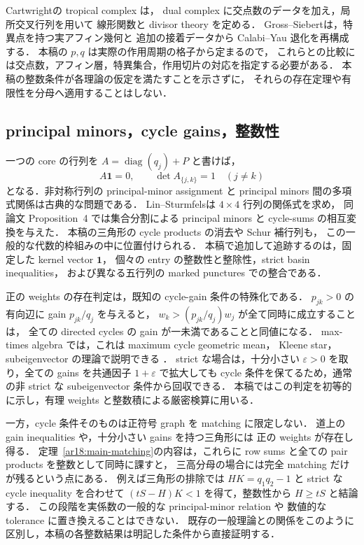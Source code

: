 Cartwright\cite[Definitions~2.5 and~2.8]{CartwrightComplexes}の tropical complex は，
dual complex に交点数のデータを加え，局所交叉行列を用いて
線形関数と divisor theory を定める．
Gross--Siebert\cite{GrossSiebert}は，特異点を持つ実アフィン幾何と
追加の接着データから Calabi--Yau 退化を再構成する．
本稿の $p,q$ は実際の作用周期の格子から定まるので，
これらとの比較には交点数，アフィン層，特異集合，作用切片の対応を指定する必要がある．
本稿の整数条件が各理論の仮定を満たすことを示さずに，
それらの存在定理や有限性を分母へ適用することはしない．

\subsection{principal minors，cycle gains，整数性}

一つの core の行列を $A=\operatorname{diag}(q_j)+P$ と書けば，
\[
 A\mathbf1=0,\qquad \det A_{\{j,k\}}=1\quad(j\ne k)
\]
となる．非対称行列の principal-minor assignment と
principal minors 間の多項式関係は古典的な問題である．
Lin--Sturmfels\cite{LinSturmfels}は $4\times4$ 行列の関係式を求め，
同論文 Proposition~4 では集合分割による principal minors と cycle-sums の相互変換を与えた．
本稿の三角形の cycle products の消去や Schur 補行列も，
この一般的な代数的枠組みの中に位置付けられる．
本稿で追加して追跡するのは，固定した kernel vector $\mathbf1$，
個々の entry の整数性と整除性，strict basin inequalities，
および異なる五行列の marked punctures での整合である．

正の weights の存在判定は，既知の cycle-gain 条件の特殊化である．
$p_{jk}>0$ の有向辺に gain $p_{jk}/q_j$ を与えると，
$w_k>(p_{jk}/q_j)w_j$ が全て同時に成立することは，
全ての directed cycles の gain が一未満であることと同値になる．
max-times algebra では，これは maximum cycle geometric mean，
Kleene star，subeigenvector の理論で説明できる
\cite[\S2, Theorem~2.2 and Proposition~2.5]{SergeevSchneiderButkovic}．
strict な場合は，十分小さい $\varepsilon>0$ を取り，全ての gains を共通因子 $1+\varepsilon$ で拡大しても
cycle 条件を保てるため，通常の非 strict な subeigenvector 条件から回収できる．
本稿ではこの判定を初等的に示し，有理 weights と整数積による厳密検算に用いる．

一方，cycle 条件そのものは正符号 graph を matching に限定しない．
道上の gain inequalities や，十分小さい gains を持つ三角形には
正の weights が存在し得る．
定理~\ref{ar18:main-matching}の内容は，これらに
row sums と全ての pair products を整数として同時に課すと，
三高分母の場合には完全 matching だけが残るという点にある．
例えば三角形の排除では $HK=q_1q_2-1$ と strict な cycle inequality を合わせて
$(tS-H)K<1$ を得て，整数性から $H\ge tS$ と結論する．
この段階を実係数の一般的な principal-minor relation や
数値的な tolerance に置き換えることはできない．
既存の一般理論との関係をこのように区別し，本稿の各整数結果は明記した条件から直接証明する．

